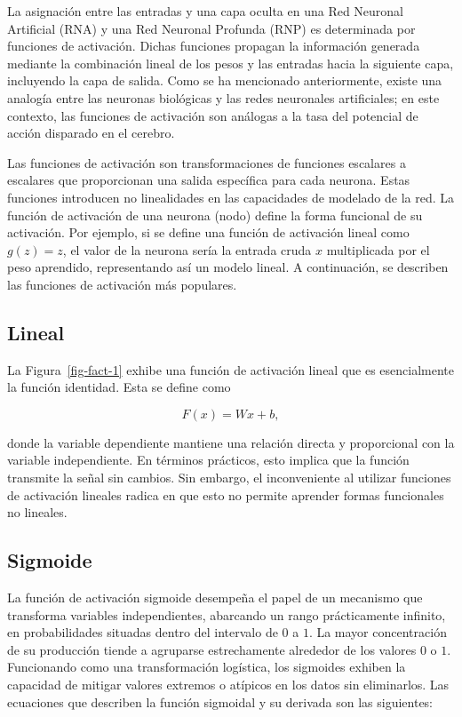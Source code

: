 \documentclass[
  us-letterpaper,
]{scrreprt}
\theoremstyle{plain}
\theoremstyle{definition}
\theoremstyle{definition}
\theoremstyle{plain}
\theoremstyle{remark}
\begin{document}
La asignación entre las entradas y una capa oculta en una Red Neuronal
Artificial (RNA) y una Red Neuronal Profunda (RNP) es determinada por
funciones de activación. Dichas funciones propagan la información
generada mediante la combinación lineal de los pesos y las entradas
hacia la siguiente capa, incluyendo la capa de salida. Como se ha
mencionado anteriormente, existe una analogía entre las neuronas
biológicas y las redes neuronales artificiales; en este contexto, las
funciones de activación son análogas a la tasa del potencial de acción
disparado en el cerebro.

Las funciones de activación son transformaciones de funciones escalares
a escalares que proporcionan una salida específica para cada neurona.
Estas funciones introducen no linealidades en las capacidades de
modelado de la red. La función de activación de una neurona (nodo)
define la forma funcional de su activación. Por ejemplo, si se define
una función de activación lineal como \(g(z) = z\), el valor de la
neurona sería la entrada cruda \(x\) multiplicada por el peso aprendido,
representando así un modelo lineal. A continuación, se describen las
funciones de activación más populares.

\subsection{Lineal}\label{lineal}

La Figura~\ref{fig-fact-1} exhibe una función de activación lineal que
es esencialmente la función identidad. Esta se define como

\[
F(x)=Wx + b,
\]

donde la variable dependiente mantiene una relación directa y
proporcional con la variable independiente. En términos prácticos, esto
implica que la función transmite la señal sin cambios. Sin embargo, el
inconveniente al utilizar funciones de activación lineales radica en que
esto no permite aprender formas funcionales no lineales.

\subsection{Sigmoide}\label{sigmoide}

La función de activación sigmoide desempeña el papel de un mecanismo que
transforma variables independientes, abarcando un rango prácticamente
infinito, en probabilidades situadas dentro del intervalo de \(0\) a
\(1\). La mayor concentración de su producción tiende a agruparse
estrechamente alrededor de los valores \(0\) o \(1\). Funcionando como
una transformación logística, los sigmoides exhiben la capacidad de
mitigar valores extremos o atípicos en los datos sin eliminarlos. Las
ecuaciones que describen la función sigmoidal y su derivada son las
siguientes:
\end{document}
